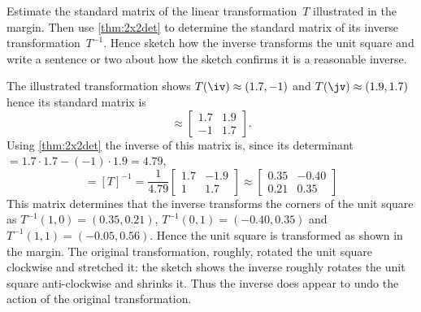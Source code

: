 \begin{example} \label{eg:}
Estimate the standard matrix of the linear transformation~\(T\) illustrated in the margin.  
%
Then use \autoref{thm:2x2det} to determine the standard matrix of its inverse transformation~\(T^{-1}\).
Hence sketch how the inverse transforms the unit square and write a sentence or two about how the sketch confirms it is a reasonable inverse. 
\begin{solution} 
The illustrated transformation shows \(T(\iv)\approx(1.7,-1)\) and \(T(\jv)\approx(1.9,1.7)\) hence its standard matrix is
\begin{equation*}
[T]\approx\begin{bmatrix} 1.7&1.9\\-1&1.7 \end{bmatrix}.
\end{equation*}
Using \autoref{thm:2x2det} the inverse of this matrix is, since its determinant\({}=1.7\cdot1.7-(-1)\cdot1.9=4.79\),
\begin{equation*}
[T^{-1}]=[T]^{-1}
=\frac1{4.79} \begin{bmatrix} 1.7&-1.9\\1&1.7 \end{bmatrix}
\approx\begin{bmatrix} 0.35&-0.40\\0.21&0.35 \end{bmatrix}
\end{equation*}
This matrix determines that the inverse transforms the corners of the unit square as \(T^{-1}(1,0)=(0.35,0.21)\), \(T^{-1}(0,1)=(-0.40,0.35)\) and \(T^{-1}(1,1)=(-0.05,0.56)\).
%
Hence the unit square is transformed as shown in the margin.
The original transformation, roughly, rotated the unit square clockwise and stretched it: the sketch shows the inverse roughly rotates the unit square anti-clockwise and shrinks it.  
Thus the inverse does appear to undo the action of the original transformation.
\end{solution}
\end{example}




